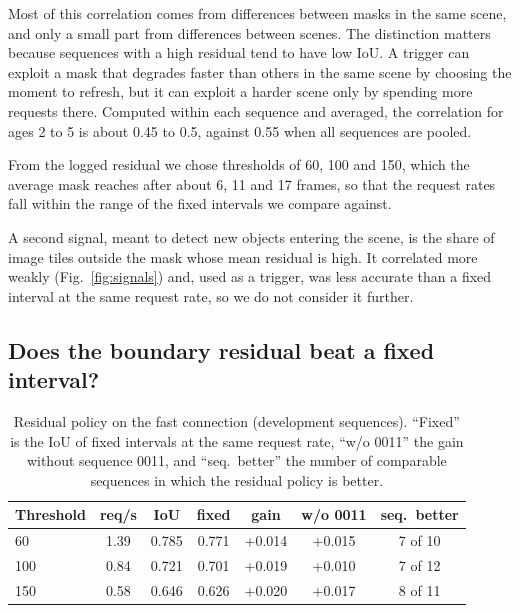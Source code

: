 \documentclass[conference]{IEEEtran}
\begin{document}
Most of this correlation comes from differences between masks in the same scene, and only a small part from differences between scenes. The distinction matters because sequences with a high residual tend to have low IoU. A trigger can exploit a mask that degrades faster than others in the same scene by choosing the moment to refresh, but it can exploit a harder scene only by spending more requests there. Computed within each sequence and averaged, the correlation for ages 2 to 5 is about 0.45 to 0.5, against 0.55 when all sequences are pooled.

From the logged residual we chose thresholds of 60, 100 and 150, which the average mask reaches after about 6, 11 and 17 frames, so that the request rates fall within the range of the fixed intervals we compare against.

A second signal, meant to detect new objects entering the scene, is the share of image tiles outside the mask whose mean residual is high. It correlated more weakly (Fig.~\ref{fig:signals}) and, used as a trigger, was less accurate than a fixed interval at the same request rate, so we do not consider it further.

\subsection{Does the boundary residual beat a fixed interval?}
\label{sec:fast}

\begin{table}[t]
\centering
\caption{Residual policy on the fast connection (development sequences). ``Fixed'' is the IoU of fixed intervals at the same request rate, ``w/o 0011'' the gain without sequence 0011, and ``seq.\ better'' the number of comparable sequences in which the residual policy is better.}
\label{tab:fast}
\footnotesize
\setlength{\tabcolsep}{3pt}
\begin{tabular}{lcccccc}
\toprule
Threshold & req/s & IoU & fixed & gain & w/o 0011 & seq.\ better \\
\midrule
60  & 1.39 & 0.785 & 0.771 & +0.014 & +0.015 & 7 of 10 \\
100 & 0.84 & 0.721 & 0.701 & +0.019 & +0.010 & 7 of 12 \\
150 & 0.58 & 0.646 & 0.626 & +0.020 & +0.017 & 8 of 11 \\
\bottomrule
\end{tabular}
\end{table}
\end{document}
